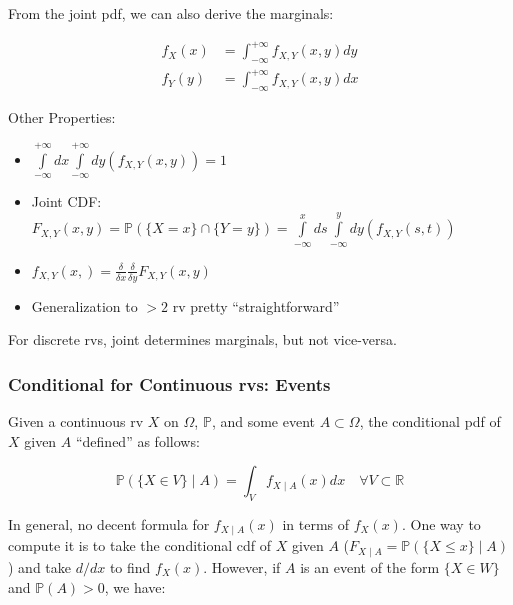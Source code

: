 \documentclass{article}
\begin{document}
From the joint pdf, we can also derive the marginals:

\begin{equation}
  \tag{Joint pdf Marginals}
  \boxed{
    \begin{split}
      f_X(x) &= \int_{-\infty}^{+\infty} f_{X,Y}(x,y) dy \\
      f_Y(y) &= \int_{-\infty}^{+\infty} f_{X,Y}(x,y) dx
    \end{split}
  }
\end{equation}

Other Properties:

\begin{itemize}
\item $\int\limits_{-\infty}^{+\infty} dx
  \int\limits_{-\infty}^{+\infty} dy (f_{X,Y}(x,y)) = 1$

\item Joint CDF: $F_{X,Y}(x,y) = \mathbb{P}(\{X=x\} \cap \{Y=y\}) =
  \int\limits_{-\infty}^{x} ds \int\limits_{-\infty}^{y} dy
  (f_{X,Y}(s,t))$

\item $f_{X,Y}(x,) = \frac{\delta}{\delta x} \frac{\delta}{\delta y}
  F_{X,Y}(x,y)$

\item Generalization to $> 2$ rv pretty ``straightforward''
\end{itemize}

For discrete rvs, joint determines marginals, but not vice-versa.

\subsubsection{Conditional for Continuous rvs: Events}

Given a continuous rv $X$ on $\Omega$, $\mathbb{P}$, and some event
$A\subset\Omega$, the conditional pdf of $X$ given $A$ ``defined'' as
follows:

\begin{equation}
  \tag{Conditional pdf: Event}
  \boxed{
    \mathbb{P}(\{X\in V\}\mid A) = \int_V f_{X\mid A}(x) dx \quad
    \forall V \subset \mathbb{R}
  }
\end{equation}

In general, no decent formula for $f_{X\mid A}(x)$ in terms of
$f_X(x)$. One way to compute it is to take the conditional cdf of $X$
given $A$ ($F_{X\mid A} = \mathbb{P}(\{X \leq x\} \mid A)$) and take
$d/dx$ to find $f_X(x)$. However, if $A$ is an event of the form $\{X
\in W\}$ and $\mathbb{P}(A)>0$, we have:
\end{document}
